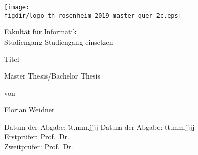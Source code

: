 \begin{titlepage}

\sffamily

\raggedleft

\vspace*{-2cm}

\texttt{[image: \\figdir/logo-th-rosenheim-2019\_master\_quer\_2c.eps]}

\vfill

\centering
\LARGE
Fakultät für Informatik  \vspace{0.5cm}\\
\Large
Studiengang Studiengang-einsetzen

\vspace{2cm}

\LARGE

Titel

\vspace{2cm}

\Large
Master Thesis/Bachelor Thesis

\vspace{1.5cm}


\Large
von

\vspace{0.5cm}


\LARGE
Florian Weidner \vspace{1cm}

\vspace{1cm}

\flushleft
 \Large
\vspace*{\fill}

\begin{tabbing}
Datum der Abgabe: \= tt.mm.jjjj \kill
Datum der Abgabe: \> tt.mm.jjjj \\
Erstprüfer: \> Prof.\ Dr.\ \\
Zweitprüfer: \> Prof.\ Dr.\
\end{tabbing}

\end{titlepage}

\cleardoubleemptypage

